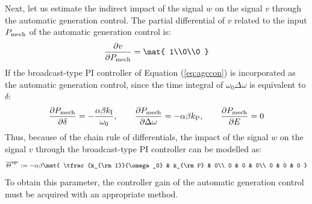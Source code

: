 \documentclass[graybox, envcountchap]{svmult}
\begin{document}
Next, let us estimate the indirect impact of the signal $w$ on the signal $v$ through the automatic generation control.  The partial differential of $v$ related to the input $P_{\rm mech}$ of the automatic generation control is:
\[
\frac{\partial v}{\partial P_{\rm mech}}
=
\mat{
1\\0\\0
}
\]
If the broadcast-type PI controller of Equation (\ref{eq:agccon}) is incorporated as the automatic generation control, since the time integral of $\omega_0 \Delta \omega$ is equivalent to $\delta$:
\[
\frac{\partial P_{\rm mech}}{\partial \delta} = -  \frac{\alpha \beta k_{\rm I}}{\omega_0} 
,\qquad
\frac{\partial P_{\rm mech}}{\partial \Delta \omega}= - \alpha \beta k_{\rm P}
,\qquad
\frac{\partial P_{\rm mech}}{\partial E}= 0
\]
Thus, because of the chain rule of differentials, the impact of the signal $w$ on the signal $v$ through the broadcast-type PI controller can be modelled as:
\begin{align}
\overline{\mathit{\Theta}}^{\rm agc}:=
-  \alpha \beta \mat{
\tfrac{k_{\rm I}}{\omega_0} & k_{\rm P}  & 0\\
0 & 0 & 0\\
0 & 0 & 0
}
\end{align}
To obtain this parameter, the controller gain of the automatic generation control must be acquired with an appropriate method.
\end{document}
